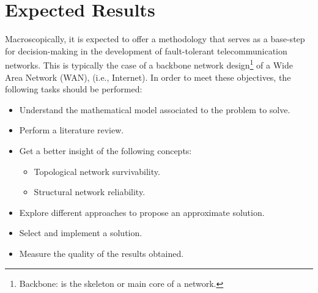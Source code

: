 \section{Expected Results}
Macroscopically, it is expected to offer a methodology that serves as a base-step for decision-making 
in the development of fault-tolerant telecommunication networks. This is typically the case of a backbone network 
design\footnote{Backbone: is the skeleton or main core of a network.} of a Wide Area Network (WAN),  
    (i.e., Internet). In order to meet these objectives, the following tasks should be performed:
\begin{itemize}
    \item Understand the mathematical model associated to the problem to solve.
    \item Perform a literature review.
    \item Get a better insight of the following concepts:
           \begin{itemize}
               \item Topological network survivability.
               \item Structural network reliability.
           \end{itemize}
    \item Explore different approaches to propose an approximate solution.
    \item Select and implement a solution.
    \item Measure the quality of the results obtained.
\end{itemize}


